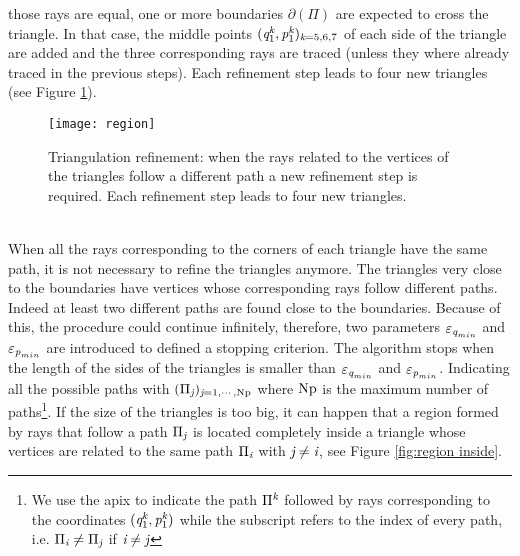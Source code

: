 those rays are equal, one or more boundaries
$\partial$$(\Pi)$ are expected to cross the triangle.
In that case, the middle points $(\textit{q}_1^{\textit{k}},\textit{p}_1^{\textit{k}})_{\textit{k}=5,6,7}$ of each side of the triangle are added and
the three corresponding rays are traced (unless they where already traced in the previous steps). Each refinement step leads to four new triangles (see Figure \ref{fig:refinement}).
 \begin{figure}[h]
  \begin{center}
  \texttt{[image: region]}
  \end{center}
  \caption{Triangulation refinement:
  when the rays related to the vertices of the triangles follow a different path a new refinement step is required.
   Each refinement step leads to four new triangles.}
  \label{fig:refinement}
\end{figure}
  \\ \indent
When all the rays corresponding to the corners of each triangle have the same path, it is not necessary to refine the triangles anymore.
The triangles very close to the boundaries have vertices whose corresponding rays follow different paths.
Indeed at least two different paths are found close to the boundaries. Because of this, the procedure could continue infinitely, therefore, two parameters $\varepsilon_{\textit{q}_{min}}$ and $\varepsilon_{\textit{p}_{min}}$ are introduced to defined a stopping criterion.
The algorithm stops when the length of the sides of the triangles is smaller than $\varepsilon_{\textit{q}_{min}}$ and $\varepsilon_{\textit{p}_{min}}$.
Indicating all the possible paths with $(\Pi_{\textit{j}})_{\textit{j}=1, \cdots, \textrm{Np}}$ where $\textrm{Np}$ is the maximum number of paths\footnote{We use the apix to indicate the path $\Pi^{\textit{k}}$ followed by rays corresponding to the coordinates $(\textit{q}_1^{\textit{k}},\textit{p}_1^{\textit{k}})$ while the subscript refers to the index of every path, i.e. $\Pi_{\textit{i}}\neq\Pi_{\textit{j}}$ if $\textit{i}\neq\textit{j}$}.
If the size of the triangles is too big, it can happen that a region formed by rays that follow a path $\Pi_{\textit{j}}$ is located completely inside a triangle whose vertices are related to the same path $\Pi_{\textit{i}}$ with $\textit{j} \neq  \textit{i}$, see Figure \ref{fig:region inside}.

